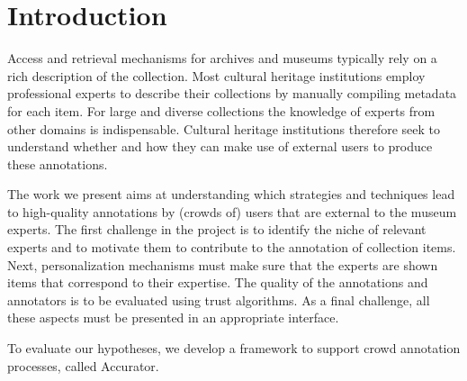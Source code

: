 \section{Introduction}\label{introduction}
Access and retrieval mechanisms for archives and museums typically rely on a rich description of the collection. 
Most cultural heritage institutions employ professional experts to describe their collections by manually compiling metadata for each item. 
For large and diverse collections the knowledge of experts from other domains is indispensable.
Cultural heritage institutions therefore seek to understand whether and how they can make use of external users to produce these annotations.

The work we present aims at understanding which strategies and techniques lead to high-quality annotations by (crowds of) users that are external to the museum experts. 
The first challenge in the project is to identify the niche of relevant experts and to motivate them to contribute to the annotation of collection items. 
Next, personalization mechanisms must make sure that the experts are shown items that correspond to their expertise. 
The quality of the annotations and annotators is to be evaluated using trust algorithms. As a final challenge, all these aspects must be presented in an appropriate interface.

To evaluate our hypotheses, we develop a framework to support crowd annotation processes, called Accurator. 